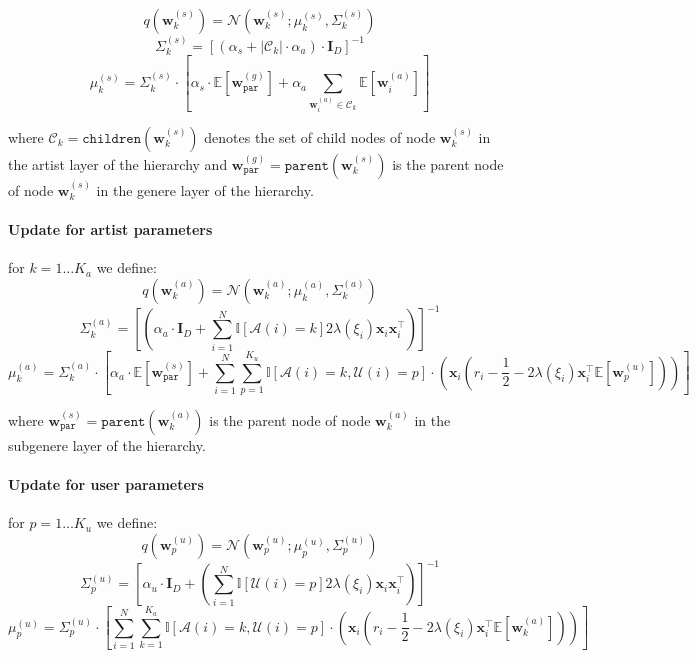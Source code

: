 \documentclass[11pt, a4paper]{article}
\begin{document}
$$q(\textbf{w}^{(s)}_{k})=\mathcal{N}\left(\textbf{w}^{(s)}_{k}; \mu^{(s)}_k, \Sigma^{(s)}_k \right)$$
$$\Sigma^{(s)}_k =\left[\left(\alpha_s+|\mathcal{C}_k|\cdot\alpha_a\right)\cdot  \textbf{I}_D \right]^{-1}$$
$$\mu^{(s)}_k=\Sigma^{(s)}_k \cdot\left[\alpha_s\cdot \mathbb{E}\left[\textbf{w}^{(g)}_{\texttt{par}}\right]+\alpha_a\sum_{\textbf{w}^{(a)}_{i}\in \mathcal{C}_k}\mathbb{E}\left[\textbf{w}^{(a)}_{i}\right] \right]$$

\noindent where $\mathcal{C}_k=\texttt{children}\left(\textbf{w}^{(s)}_{k}\right)$ denotes the set of child nodes of node $\textbf{w}^{(s)}_{k}$ in the artist layer of the hierarchy and $\textbf{w}^{(g)}_{\texttt{par}}=\texttt{parent}\left(\textbf{w}^{(s)}_{k}\right)$ is the parent node of node $\textbf{w}^{(s)}_{k}$ in the genere layer of the hierarchy.

\paragraph{Update for artist parameters}
\noindent for $k=1\dots K_a$ we define:
$$q(\textbf{w}^{(a)}_{k})=\mathcal{N}\left(\textbf{w}^{(a)}_{k}; \mu^{(a)}_k, \Sigma^{(a)}_k \right)$$
$$\Sigma^{(a)}_k =\left[\left(\alpha_a \cdot \textbf{I}_D+\sum_{i=1}^N \mathbb{I}\left[\mathcal{A}(i)=k\right]2\lambda(\xi_i)\textbf{x}_i\textbf{x}_i^\top  \right)\right]^{-1}$$
$$\mu^{(a)}_k=\Sigma^{(a)}_k \cdot\left[\alpha_a\cdot \mathbb{E}\left[\textbf{w}^{(s)}_{\texttt{par}}\right]+\sum_{i=1}^N \sum_{p=1}^{K_u} \mathbb{I}\left[\mathcal{A}(i)=k,\mathcal{U}(i)=p\right] \cdot \left( \textbf{x}_i\left(r_i-\frac{1}{2} - 2\lambda(\xi_i) \textbf{x}_i^\top\mathbb{E}\left[\textbf{w}^{(u)}_{p}\right]\right)\right)\right]$$

\noindent where $\textbf{w}^{(s)}_{\texttt{par}}=\texttt{parent}\left(\textbf{w}^{(a)}_{k}\right)$ is the parent node of node $\textbf{w}^{(a)}_{k}$ in the subgenere layer of the hierarchy.

\paragraph{Update for user parameters}
\noindent for $p=1\dots K_u$ we define:
$$q(\textbf{w}^{(u)}_{p})=\mathcal{N}\left(\textbf{w}^{(u)}_{p}; \mu^{(u)}_p, \Sigma^{(u)}_p \right)$$
$$\Sigma^{(u)}_p =\left[\alpha_u \cdot \textbf{I}_D +\left(\sum_{i=1}^N \mathbb{I}\left[\mathcal{U}(i)=p\right]2\lambda(\xi_i)\textbf{x}_i\textbf{x}_i^\top  \right)\right]^{-1}$$
$$\mu^{(u)}_p=\Sigma^{(u)}_p \cdot\left[\sum_{i=1}^N \sum_{k=1}^{K_a} \mathbb{I}\left[\mathcal{A}(i)=k,\mathcal{U}(i)=p\right] \cdot \left( \textbf{x}_i\left(r_i-\frac{1}{2} - 2\lambda(\xi_i) \textbf{x}_i^\top\mathbb{E}\left[\textbf{w}^{(a)}_{k}\right]\right)\right)\right]$$
\end{document}

